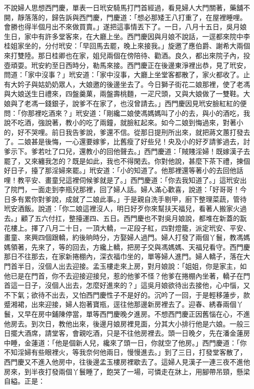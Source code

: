 不說婦人思想西門慶，單表一日玳安騎馬打門首經過，看見婦人大門關著，藥舖不開，靜落落的，歸告訴與西門慶，門慶道：「想必那矮王八打重了，在屋裡睡哩。會勝也得半個月出不來做買賣。」遂把這事情丟下了。一日，八月十五日，吳月娘生日，家中有許多堂客來，在大廳上坐。西門慶因與月娘不說話，一逕都來院中李桂姐家坐的，分付玳安：「早回馬去罷，晚上來接我。」旋邀了應伯爵、謝希大兩個來打雙陸。那日桂卿也在家，姐兒兩個在傍陪待、勸酒。良久，都出來院子內，投壺頑耍。玳安約至日西時分，勒馬來接。西門慶正在後邊東淨裡出恭，見了玳安，問道：「家中沒事？」玳安道：「家中沒事，大廳上坐堂客都散了，家火都收了。止有大妗子與姑奶奶眾人，大娘邀的後邊坐去了。今日獅子街花二娘那裡，使了老馮與大娘送生日禮來，四盤羹菓，兩盤壽桃麵，一疋尺頭，又與大娘做了一雙鞋。大娘與了老馮一錢銀子，說爹不在家了，也沒曾請去。」西門慶因見玳安臉紅紅的便問：「你那裡吃酒來？」玳安道：「剛纔二娘使馮媽媽叫了小的去，與小的酒吃，我說不吃酒，強說著，教小的吃了兩鐘，就臉紅起來。如今二娘到悔過來，對著小的，好不哭哩。前日我告爹說，爹還不信。從那日提刑所出來，就把蔣文蕙打發去了。二娘甚是後悔，一心還要嫁爹，比舊瘦了好些兒！央及小的好歹請爹過去，討爹示下。爹若吐了口兒，還教小的回他聲去。」西門慶道：「賊賤淫婦！既嫁漢子去罷了，又來纏我怎的？既是如此，我也不得閑去。你對他說，甚麼下茶下禮，揀個好日子，擡了那淫婦來罷。」玳安道：「小的知道了。他那裡還等著小的去回他話哩！教平安、畫童兒這裡伺候爹就是了。」西門慶道：「你去我知道了。」這玳安出了院門，一面走到李瓶兒那裡，回了婦人話。婦人滿心歡喜，說道：「好哥哥！今日多有累你對爹說，成就了二娘此事。」于是親自洗手剔甲，廚下整理菜蔬，管待玳安酒飯。說道：「你二娘這裡沒人，明日好歹你來幫扶天福兒，看著人搬家火過去。」顧了五六付扛，整擡運四、五日。西門慶也不對吳月娘說，都堆在新蓋的翫花樓上。擇了八月二十日，一頂大轎，一疋段子紅，四對燈籠，派定玳安、平安、畫童、來興四個跟轎，約後晌時分，方娶婦人過門。婦人打發了兩個丫鬟，教馮媽媽領著，先來了，等的回去，方纔上轎，把房子交與馮媽媽、天福兒看守。西門慶那日不往那去，在家新捲棚內，深衣福巾坐的，單等婦人進門。婦人轎子，落在大門首半日，沒個人出去迎接。孟玉樓走來上房，對月娘說：「姐姐，你是家主，如他已是在門首，你不去迎接迎接兒，惹的他爹不怪？他爹在捲棚內坐著，轎子在門首這一日子，沒個人出去，怎麼好進來的？」這吳月娘欲待出去接他，心中惱，又不下氣；欲待不出去，又怕西門慶性子不是好的。沉吟了一回，于是輕移蓮步，款蹙湘裙，出來迎接，婦人抱著寶瓶，逕往他那邊新房裡去了。迎春、綉春兩個丫鬟，又早在房中鋪陳停當，單等西門慶晚夕進房。不想西門慶正因舊惱在心，不進他房去。到次日，教他出來，後邊月娘房裡見面，分其大小排行他是六娘。一般三日擺大酒席，請堂客，會親吃酒，只是不往他房裡去。頭一日晚夕，先在潘金蓮房中睡，金蓮道：「他是個新人兒，纔來了頭一日，你就空了他房。」西門慶道：「你不知淫婦有些眼裡火，等我奈何他兩日，慢慢進去。」到了三日，打發堂客散了，西門慶又不進入他房中，往後邊孟玉樓房裡歇去了。這婦人見漢子一連三夜不進他房來，到半夜打發兩個丫鬟睡了，飽哭了一場，可憐走在牀上，用腳帶吊頸，懸梁自縊。正是：

